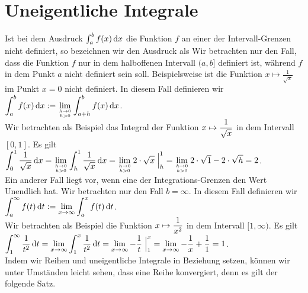 \section{Uneigentliche Integrale}
Ist bei dem Ausdruck $\int_a^b f(x)\,\textrm{d} x$ die Funktion $f$ an einer der Intervall-Grenzen
nicht definiert, so bezeichnen wir den Ausdruck als   Wir
betrachten nur den Fall, dass die Funktion $f$ nur in dem halboffenen Intervall $(a, b]$
definiert ist, w\"ahrend $f$  in dem Punkt $a$ nicht definiert sein soll.  Beispielsweise
ist die Funktion $x \mapsto \frac{1}{\sqrt{x}}$ im Punkt $x=0$ nicht definiert.  In diesem
Fall definieren wir 
\\[0.2cm]
\hspace*{1.3cm}
$\displaystyle \int_a^b f(x)\, \textrm{d} x := \lim\limits_{h\rightarrow 0 \atop h > 0} \int_{a+h}^b f(x)\, \textrm{d} x$.
\\[0.2cm]
Wir betrachten als Beispiel das Integral der Funktion $\displaystyle x \mapsto \frac{1}{\sqrt{x}}$ in
dem Intervall $[0,1]$.  Es gilt
\\[0.2cm]
\hspace*{1.3cm}
$\displaystyle \int_0^1 \frac{1}{\sqrt{x}}\, \textrm{d} x 
 = \lim\limits_{h\rightarrow 0 \atop h >  0} \int_{h}^1 \frac{1}{\sqrt{x}}\, \textrm{d} x
 = \lim\limits_{h\rightarrow 0 \atop h >  0} 2\cdot\sqrt{x}\; \Big|_h^1
 = \lim\limits_{h\rightarrow 0 \atop h >  0} 2\cdot\sqrt{1} - 2\cdot\sqrt{h} = 2$.
\\[0.2cm]
Ein anderer Fall liegt vor, wenn eine der Integrations-Grenzen den Wert Unendlich hat.
Wir betrachten nur den Fall $b= \infty$.  In diesem Fall definieren wir
\\[0.2cm]
\hspace*{1.3cm}
$\displaystyle \int_a^\infty f(t)\, \textrm{d} t := \lim\limits_{x\rightarrow \infty} \int_{a}^x f(t)\, \textrm{d} t$.
\\[0.2cm]
Wir betrachten als Beispiel die Funktion $\displaystyle x \mapsto \frac{1}{x^2}$ in dem Intervall
$[1,\infty)$. Es gilt
\\[0.2cm]
\hspace*{1.3cm}
$\displaystyle \int_1^\infty \frac{1}{t^2}\, \textrm{d} t = 
\lim\limits_{x\rightarrow \infty} \int_{1}^x \frac{1}{t^2}\, \textrm{d} t =
\lim\limits_{x\rightarrow \infty} - \frac{1}{t}\;\Big|_1^x =
\lim\limits_{x\rightarrow \infty} - \frac{1}{x} + \frac{1}{1}  = 1
$.
\\[0.2cm]
Indem wir Reihen und uneigentliche Integrale in Beziehung setzen, k\"onnen wir unter
Umst\"anden leicht sehen, dass eine Reihe konvergiert, denn es gilt der folgende Satz.



